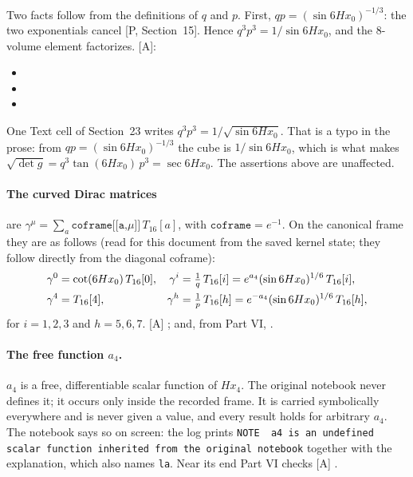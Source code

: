 Two facts follow from the definitions of $q$ and $p$. First, $qp=(\sin 6Hx_0)^{-1/3}$: the two
exponentials cancel [P, Section~15]. Hence $q^3p^3=1/\sin 6Hx_0$, and the 8-volume element
factorizes. [A]:
\begin{itemize}
  \item {}
  \item {}
  \item {}
\end{itemize}
One Text cell of Section~23 writes $q^3p^3=1/\sqrt{\sin 6Hx_0}$. That is a typo in the prose:
from $qp=(\sin 6Hx_0)^{-1/3}$ the cube is $1/\sin 6Hx_0$, which is what makes
$\sqrt{\det g}=q^3\tan(6Hx_0)\,p^3=\sec 6Hx_0$. The assertions above are unaffected.

\paragraph{The curved Dirac matrices} are
$\gamma^\mu=\sum_a \texttt{coframe[[a,}\mu\texttt{]]}\,T_{16}[a]$, with $\texttt{coframe}=e^{-1}$.
On the canonical frame they are as follows (read for this document from the saved kernel
state; they follow directly from the diagonal coframe):
\begin{align}
  \gamma^0&=\cot(6Hx_0)\,T_{16}[0], &
  \gamma^i&=\tfrac1q\,T_{16}[i]=e^{a_4}(\sin 6Hx_0)^{1/6}\,T_{16}[i],\notag\\
  \gamma^4&=T_{16}[4], &
  \gamma^h&=\tfrac1p\,T_{16}[h]=e^{-a_4}(\sin 6Hx_0)^{1/6}\,T_{16}[h],
\end{align}
for $i=1,2,3$ and $h=5,6,7$. [A]
; and, from Part VI,
.

\paragraph{The free function $a_4$.} $a_4$ is a free, differentiable scalar function of $Hx_4$.
The original notebook never defines it; it occurs only inside the recorded frame. It is carried
symbolically everywhere and is never given a value, and every result holds for arbitrary $a_4$.
The notebook says so on screen: the log prints
\texttt{NOTE~~a4 is an undefined scalar function inherited from the original notebook} together
with the explanation, which also names \texttt{la}. Near its end Part VI checks [A]
.

